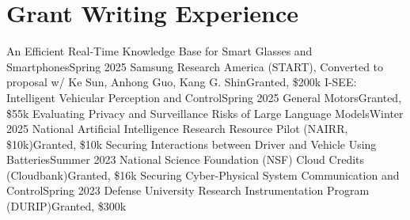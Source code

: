 \section{Grant Writing Experience}
  \CVSubHeadingListStart
    \CVSubheading
      {An Efficient Real-Time Knowledge Base for Smart Glasses and Smartphones}{Spring 2025}
      {Samsung Research America (START), Converted to proposal w/ Ke Sun, Anhong Guo, Kang G. Shin}{Granted, \$200k}
    \CVSubheading
      {I-SEE: Intelligent Vehicular Perception and Control}{Spring 2025}
      {General Motors}{Granted, \$55k}
    \CVSubheading
      {Evaluating Privacy and Surveillance Risks of Large Language Models}{Winter 2025}
      {National Artificial Intelligence Research Resource Pilot (NAIRR, \$10k)}{Granted, \$10k}
    \CVSubheading
      {Securing Interactions between Driver and Vehicle Using Batteries}{Summer 2023}
      {National Science Foundation (NSF) Cloud Credits (Cloudbank)}{Granted, \$16k}
    \CVSubheading
      {Securing Cyber-Physical System Communication and Control}{Spring 2023}
      {Defense University Research Instrumentation Program (DURIP)}{Granted, \$300k}
  \CVSubHeadingListEnd